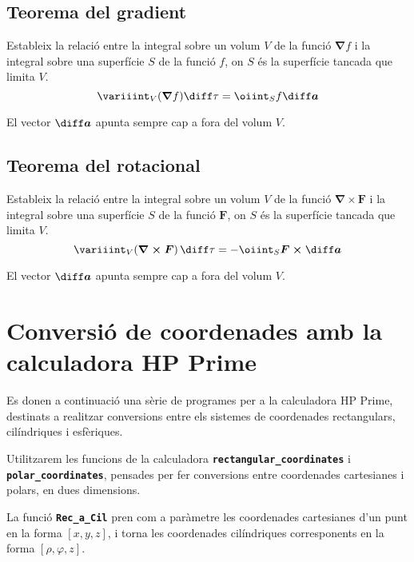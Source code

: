 \documentclass[catalan,a4paper,twoside,11pt]{article}
\begin{document}
\subsection{Teorema del gradient}
Estableix la relació entre la integral sobre un volum $V$ de la funció $\boldsymbol{\nabla}f$ i la integral sobre una superfície $S$ de la funció $f$, on $S$ és la superfície tancada que limita $V$.
\begin{equation}
    \variiint_V(\boldsymbol{\nabla}f)\diff \tau = \oiint_S f\boldsymbol{\diff a}
\end{equation}

El vector $\boldsymbol{\diff a}$ apunta sempre cap a fora del volum $V$.

\subsection{Teorema del rotacional}
Estableix la relació entre la integral sobre un volum $V$ de la funció $\boldsymbol{\nabla\times F}$ i la integral sobre una superfície $S$ de la funció $\boldsymbol{F}$, on $S$ és la superfície tancada que limita $V$.
\begin{equation}
    \variiint_V(\boldsymbol{\nabla\times F})\,\diff \tau=-\oiint_S
    \boldsymbol{F\times\diff a}
\end{equation}

El vector $\boldsymbol{\diff a}$ apunta sempre cap a fora del volum $V$.

\section{Conversió de coordenades amb la calculadora HP Prime}

\lstset{
	language=HPPRIME,
	basicstyle=\small\sf,
	numbers=left,
	frame=lines
}

Es donen a continuació una sèrie de programes per a la calculadora HP Prime, destinats a realitzar conversions entre els  sistemes de coordenades rectangulars, cilíndriques i esfèriques.

Utilitzarem les funcions de la calculadora \texttt{\textbf{rectangular\_coordinates}} i \texttt{\textbf{polar\_coordinates}}, pensades per fer conversions entre coordenades cartesianes i polars, en dues dimensions.

La funció \texttt{\textbf{Rec\_a\_Cil}} pren com a paràmetre les coordenades cartesianes d'un punt en la forma $[x,y,z]$, i torna les coordenades cilíndriques corresponents en la forma $[\rho,\varphi,z]$.

\end{document}
